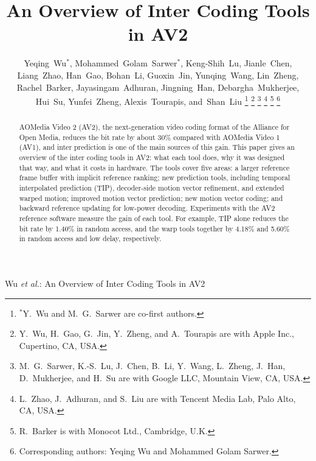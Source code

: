 \documentclass[journal]{IEEEtran}
\begin{document}

\title{An Overview of Inter Coding Tools in AV2}

\author{Yeqing~Wu$^{*}$,
        Mohammed~Golam~Sarwer$^{*}$,
        Keng-Shih~Lu,
        Jianle~Chen,
        Liang~Zhao,
        Han~Gao,
        Bohan~Li,
        Guoxin~Jin,
        Yunqing~Wang,
        Lin~Zheng,
        Rachel~Barker,
        Jayasingam~Adhuran,
        Jingning~Han,
        Debargha~Mukherjee,
        Hui~Su,
        Yunfei~Zheng,
        Alexis~Tourapis,
        and~Shan~Liu%
\thanks{$^{*}$Y.~Wu and M.~G.~Sarwer are co-first authors.}%
\thanks{Y.~Wu, H.~Gao, G.~Jin, Y.~Zheng, and A.~Tourapis are with Apple Inc., Cupertino, CA, USA.}%
\thanks{M.~G.~Sarwer, K.-S.~Lu, J.~Chen, B.~Li, Y.~Wang, L.~Zheng, J.~Han, D.~Mukherjee, and H.~Su are with Google LLC, Mountain View, CA, USA.}%
\thanks{L.~Zhao, J.~Adhuran, and S.~Liu are with Tencent Media Lab, Palo Alto, CA, USA.}%
\thanks{R.~Barker is with Monocot Ltd., Cambridge, U.K.}%
\thanks{Corresponding authors: Yeqing Wu and Mohammed Golam Sarwer.}}

%
{Wu \MakeLowercase{\textit{et al.}}: An Overview of Inter Coding Tools in AV2}

\maketitle

\begin{abstract}
AOMedia Video 2 (AV2), the next-generation video coding format of the
Alliance for Open Media, reduces the bit rate by about 30\% compared with
AOMedia Video 1 (AV1), and inter prediction is one of the main sources of this
gain. This paper gives an overview of the inter coding tools in AV2: what each
tool does, why it was designed that way, and what it costs in hardware. The
tools cover five areas: a larger reference frame buffer with implicit
reference ranking; new prediction tools, including temporal interpolated
prediction (TIP), decoder-side motion vector refinement, and extended warped
motion; improved motion vector prediction; new motion vector coding; and
backward reference updating for low-power decoding. Experiments with the AV2
reference software measure the gain of each tool. For example, TIP alone
reduces the bit rate by 1.40\% in random access, and the warp tools together
by 4.18\% and 5.60\% in random access and low delay, respectively.
\end{abstract}
\end{document}
